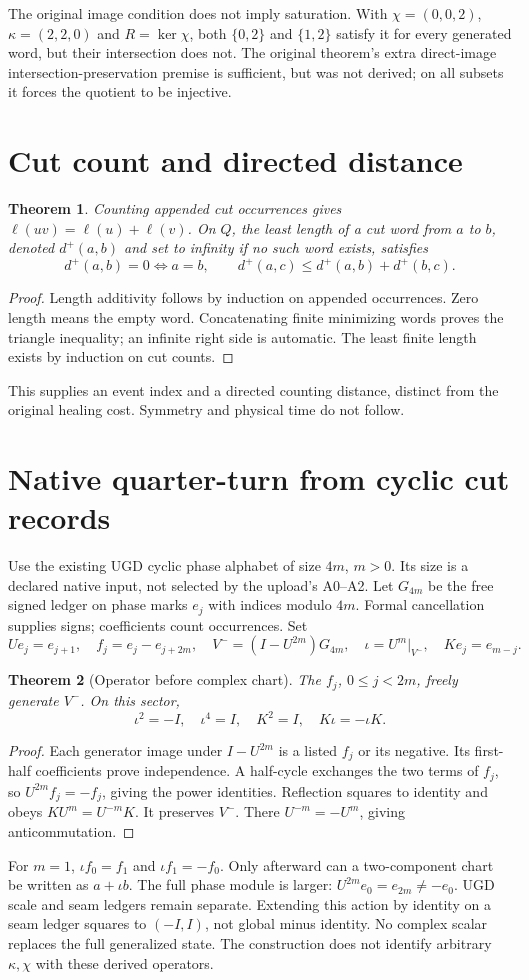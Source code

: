 \documentclass[11pt]{article}
\newtheorem{theorem}{Theorem}
\begin{document}
The original image condition does not imply saturation. With
$\chi=(0,0,2)$, $\kappa=(2,2,0)$ and $R=\ker\chi$, both
$\{0,2\}$ and $\{1,2\}$ satisfy it for every generated word, but their
intersection does not. The original theorem's extra direct-image
intersection-preservation premise is sufficient, but was not derived;
on all subsets it forces the quotient to be injective.

\section{Cut count and directed distance}
\begin{theorem}
Counting appended cut occurrences gives $\ell(uv)=\ell(u)+\ell(v)$.
On $Q$, the least length of a cut word from $a$ to $b$, denoted $d^+(a,b)$
and set to infinity if no such word exists, satisfies
\[
d^+(a,b)=0\iff a=b,\qquad
d^+(a,c)\le d^+(a,b)+d^+(b,c).
\]
\end{theorem}
\begin{proof}
Length additivity follows by induction on appended occurrences. Zero length
means the empty word. Concatenating finite minimizing words proves the
triangle inequality; an infinite right side is automatic. The least finite
length exists by induction on cut counts.
\end{proof}
This supplies an event index and a directed counting distance, distinct from
the original healing cost. Symmetry and physical time do not follow.

\section{Native quarter-turn from cyclic cut records}
Use the existing UGD cyclic phase alphabet of size $4m$, $m>0$. Its size is
a declared native input, not selected by the upload's A0--A2. Let $G_{4m}$
be the free signed ledger on phase marks $e_j$ with indices modulo $4m$.
Formal cancellation supplies signs; coefficients count occurrences. Set
\[
Ue_j=e_{j+1},\quad f_j=e_j-e_{j+2m},\quad
V^-=(I-U^{2m})G_{4m},\quad \iota=U^m|_{V^-},\quad Ke_j=e_{m-j}.
\]
\begin{theorem}[Operator before complex chart]
The $f_j$, $0\le j<2m$, freely generate $V^-$. On this sector,
\[
\iota^2=-I,\quad\iota^4=I,\quad K^2=I,\quad K\iota=-\iota K.
\]
\end{theorem}
\begin{proof}
Each generator image under $I-U^{2m}$ is a listed $f_j$ or its negative.
Its first-half coefficients prove independence. A half-cycle exchanges the
two terms of $f_j$, so $U^{2m}f_j=-f_j$, giving the power identities.
Reflection squares to identity and obeys $KU^m=U^{-m}K$. It preserves
$V^-$. There $U^{-m}=-U^m$, giving anticommutation.
\end{proof}
For $m=1$, $\iota f_0=f_1$ and $\iota f_1=-f_0$. Only afterward can a
two-component chart be written as $a+\iota b$. The full phase module is
larger: $U^{2m}e_0=e_{2m}\ne-e_0$. UGD scale and seam ledgers remain
separate. Extending this action by identity on a seam ledger squares to
$(-I,I)$, not global minus identity. No complex scalar replaces the full
generalized state. The construction does not identify arbitrary
$\kappa,\chi$ with these derived operators.
\end{document}
